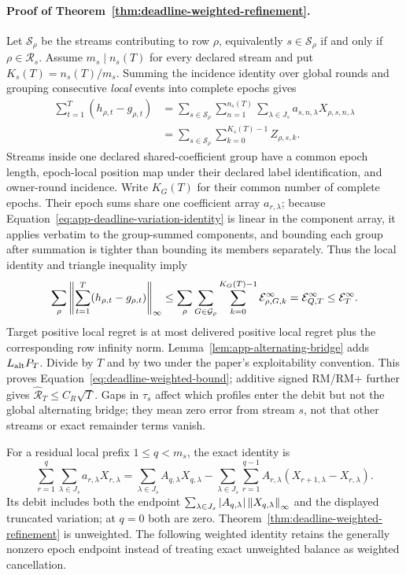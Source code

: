 \paragraph{Proof of Theorem~\ref{thm:deadline-weighted-refinement}.}
Let $\mathcal S_\rho$ be the streams contributing to row $\rho$, equivalently
$s\in\mathcal S_\rho$ if and only if $\rho\in\mathcal R_s$.  Assume
$m_s\mid n_s(T)$ for every declared stream and put
$K_s(T)=n_s(T)/m_s$.  Summing the incidence identity over global rounds and
grouping consecutive \emph{local} events into complete epochs gives
\begin{align}
\sum_{t=1}^T(h_{\rho,t}-g_{\rho,t})
&=\sum_{s\in\mathcal S_\rho}\sum_{n=1}^{n_s(T)}
  \sum_{\lambda\in J_s}a_{s,n,\lambda}
  X_{\rho,s,n,\lambda}\nonumber\\
&=\sum_{s\in\mathcal S_\rho}\sum_{k=0}^{K_s(T)-1}Z_{\rho,s,k}.
\label{eq:app-deadline-incidence-pullback}
\end{align}
Streams inside one declared shared-coefficient group have a common epoch
length, epoch-local position map under their declared label identification,
and owner-round incidence.  Write $K_G(T)$ for their common number of complete
epochs.  Their epoch sums share one coefficient array $a_{r,\lambda}$; because
Equation~\ref{eq:app-deadline-variation-identity} is linear in the component
array, it applies verbatim to the group-summed components, and bounding each
group after summation is tighter than bounding its members separately.  Thus
the local identity and triangle inequality imply
\begin{equation}
\sum_\rho\left\lVert \sum_{t=1}^T(h_{\rho,t}-g_{\rho,t}) \right\rVert_\infty
\le
\sum_\rho\sum_{G\in\mathcal G_\rho}
\sum_{k=0}^{K_G(T)-1}\mathcal E_{\rho,G,k}^\infty
=\mathcal E_{Q,T}^\infty
\le\mathcal E_T^\infty .
\label{eq:app-deadline-row-transfer}
\end{equation}
Target positive local regret is at most delivered positive local regret plus
the corresponding row infinity norm.  Lemma~\ref{lem:app-alternating-bridge}
adds $L_{\rm alt}P_T$.  Divide by $T$ and by two under the paper's
exploitability convention.  This proves Equation~\ref{eq:deadline-weighted-bound};
additive signed RM/RM+ further gives
$\widehat{\mathcal R}_T\le C_R\sqrt T$.  Gaps in $\tau_s$ affect which
profiles enter the debit but not the global alternating bridge; they mean zero
error from stream $s$, not that other streams or exact remainder terms vanish.

For a residual local prefix $1\le q<m_s$, the exact identity is
\begin{equation}
\sum_{r=1}^{q}\sum_{\lambda\in J_s}a_{r,\lambda}X_{r,\lambda}
=\sum_{\lambda\in J_s}A_{q,\lambda}X_{q,\lambda}
-\sum_{\lambda\in J_s}\sum_{r=1}^{q-1}A_{r,\lambda}
(X_{r+1,\lambda}-X_{r,\lambda}).
\label{eq:app-deadline-residual-prefix}
\end{equation}
Its debit includes both the endpoint
$\sum_{\lambda\in J_s}|A_{q,\lambda}|
\left\lVert X_{q,\lambda} \right\rVert_\infty$ and the displayed truncated variation;
at $q=0$ both are zero.  Theorem~\ref{thm:deadline-weighted-refinement} is
unweighted.  The following weighted identity retains the generally nonzero
epoch endpoint instead of treating exact unweighted balance as weighted
cancellation.

